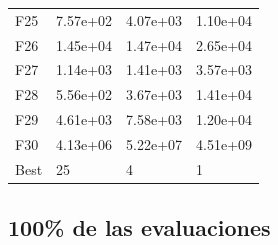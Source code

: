 \begin{table}[H]
\begin{minipage}{.5\linewidth}
\begin{tabular}{llll}
        F25  &  7.57e+02 &   4.07e+03 &  1.10e+04 \\
        F26  &  1.45e+04 &   1.47e+04 &  2.65e+04 \\
        F27  &  1.14e+03 &   1.41e+03 &  3.57e+03 \\
        F28  &  5.56e+02 &   3.67e+03 &  1.41e+04 \\
        F29  &  4.61e+03 &   7.58e+03 &  1.20e+04 \\
        F30  &  4.13e+06 &   5.22e+07 &  4.51e+09 \\
        Best &        25 &          4 &         1 \\
        \bottomrule
        \end{tabular}
        
    \end{minipage} 
\end{table}


\subsection*{100\% de las evaluaciones}

